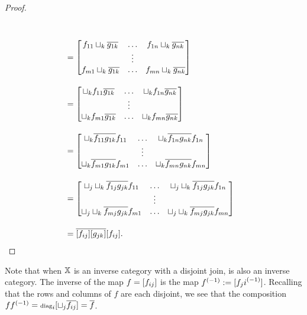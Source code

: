 \begin{proof}
\begin{align*}
        \\[10pt]
      & = \begin{bmatrix}
        f_{11}\djoin_k \rst{g_{1 k}} &\ldots & f_{1n}\djoin_k \rst{g_{n k}} \\
        & \vdots & \\
        f_{m1}\djoin_k \rst{g_{1 k}} &\ldots & f_{m n}\djoin_k \rst{g_{n k}}
      \end{bmatrix}\\[10pt]
      & = \begin{bmatrix}
        \djoin_k f_{11}\rst{g_{1 k}} &\ldots & \djoin_k f_{1n}\rst{g_{n k}} \\
        & \vdots & \\
        \djoin_k f_{m1}\rst{g_{1 k}} &\ldots & \djoin_k f_{m n}\rst{g_{n k}}
      \end{bmatrix}\\[10pt]
      & = \begin{bmatrix}
        \djoin_k \rst{f_{11} g_{1 k}} f_{11} &\ldots & \djoin_k \rst{f_{1n} g_{n k}} f_{1n}\\
        & \vdots & \\
        \djoin_k \rst{f_{m1} g_{1 k}}f_{m1} &\ldots & \djoin_k \rst{f_{m n} g_{n k}}f_{m n}
      \end{bmatrix}\\[10pt]
      & = \begin{bmatrix} %
        \djoin_\jay\djoin_k \rst{f_{1\jay} g_{\jay k}} f_{11} &\ldots &
          \djoin_\jay\djoin_k \rst{f_{1\jay} g_{\jay k}} f_{1n}\\
        & \vdots & \\
        \djoin_\jay\djoin_k \rst{f_{m\jay} g_{\jay k}}f_{m1} &\ldots &
          \djoin_\jay\djoin_k \rst{f_{m \jay} g_{\jay k}}f_{m n}
      \end{bmatrix}\\[10pt]
      &= \rst{[f_{i\jay}][g_{\jay k}]} [f_{i\jay}].
  \end{align*}
\end{proof}

Note that when $\mathbb{X}$ is an inverse category with a disjoint join, \imatx is also an inverse
category. The inverse of the map $f = [f_{ij}]$ is the map ${f}^{(-1)}:=[{f_j i}^{(-1)}]$. Recalling
that the rows and columns of $f$ are each disjoint, we see that the composition
$f {f}^{(-1)} = \operatorname{\scriptstyle{diag}}_i [\sqcup_j \overline{f_{ij}}] = \overline{f}$.

